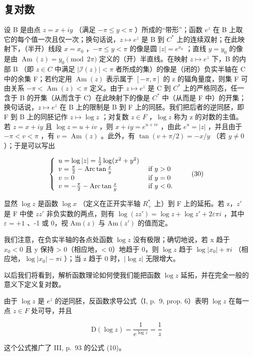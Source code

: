 \subsection{复对数}

设 B 是由点 \(z = x + iy\) （满足 \(-\pi \leqslant y < \pi\) ）所成的“带形”；函数 \(e^{z}\) 在 B 上取它的每个值一次且仅一次；换句话说，\(z \mapsto e^{z}\) 是 B 到 \(C^{*}\) 上的连续双射；在此映射下，（半开）线段 \(x = x_{0}\) ，\(-\pi \leqslant y < \pi\) 的像是圆 \(|z| = e^{x_{0}}\) ；直线 \(y = y_{0}\) 的像是由 \(\operatorname{Am}(z) = y_{0} \pmod{2\pi}\) 定义的（开）半直线。在映射 \(z \mapsto e^{z}\) 下，B 的内部 B （即 \(z \in C\) 中满足 \(|\mathcal{I}(z)| < \pi\) 者所成的集）的像是（闭的）负实半轴在 C 中的余集 F；若约定用 \(\operatorname{Am}(z)\) 表示属于 \([-\pi, \pi]\) 的 z 的辐角量度，则集 F 可由关系 \(-\pi < \operatorname{Am}(z) < \pi\) 定义。由于 \(z \mapsto e^{z}\) 是 C 到 \(C^{*}\) 上的严格同态，任一含于 B 的开集（从而含于 C）在此映射下的像是 \(C^{*}\) 中（从而是 F 中）的开集；换句话说，\(z \mapsto e^{z}\) 在 B 上的限制是 B 到 F 上的同胚。我们把后者的逆同胚，即 F 到 B 上的同胚记作 \(z \mapsto \log z\) ；对复数 \(z \in F\) ，\(\log z\) 称为 z 的对数的主值。若 \(z = x + iy\) 且 \(\log z = u + iv\) ，则 \(x + iy = e^{u + iv}\) ，由此 \(e^{u} = |z|\) ，并且由于 \(-\pi < v < \pi\) ，有 \(v = \operatorname{Am}(z)\) 。此外，有 \(\tan(v + \pi/2) = -x/y\) （若 \(y \neq 0\) ）；于是可以写出

\[
\left\{ \begin{array}{l l} u = \log | z | = \frac {1}{2} \log (x ^ {2} + y ^ {2}) \\ v = \frac {\pi}{2} - \operatorname{Arc} \tan \frac {x}{y} & \text { if } y > 0 \\ v = 0 & \text { if } y = 0 \\ v = - \frac {\pi}{2} - \operatorname{Arc} \tan \frac {x}{y} & \text { if } y <   0. \end{array} \right.\tag{30}
\]

显然 \(\log z\) 是函数 \(\log x\) （定义在正开实半轴 \(R_{+}^{*}\) 上）到 F 上的延拓。若 z，\(z'\) 是 F 中使 \(zz'\) 非负实数的两点，则有 \(\log(zz') = \log z + \log z' + 2\varepsilon\pi i\) ，其中 \(\varepsilon = +1\) 、-1 或 0，视 \(\mathrm{Am}(z)\) 与 \(\mathrm{Am}(z')\) 的值而定。

我们注意，在负实半轴的各点处函数 \(\log z\) 没有极限；确切地说，若 x 趋于 \(x_{0} < 0\) 且 y 保持 \textgreater{} 0（相应地，\textless{} 0）地趋于 0，则 \(\log z\) 趋于 \(\log |x_{0}| + \pi i\) （相应地，\(\log |x_{0}| - \pi i\) ）；当 z 趋于 0 时，\(|\log z|\) 无限增大。

以后我们将看到，解析函数理论如何使我们能把函数 \(\log z\) 延拓，并在完全一般的意义下定义复对数。

由于 \(\log z\) 是 \(e^{z}\) 的逆同胚，反函数求导公式（I, p.~9, prop. 6）表明 \(\log z\) 在每一点 \(z \in F\) 处可导，并且

\[
\mathrm{D} (\log z) = \frac {1}{e ^ {\log z}} = \frac {1}{z}\tag{31}
\]

这个公式推广了 III, p.~93 的公式 (10)。

